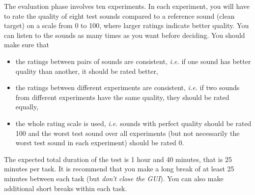 \documentclass[a4paper,12pt]{article}
\begin{document}
\noindent The evaluation phase involves ten experiments. In each experiment, you will have to rate the quality of eight test sounds compared to a reference sound (clean target) on a scale from 0 to 100, where larger ratings indicate better quality. You can listen to the sounds as many times as you want before deciding. You should make sure that
\begin{itemize}
\item the ratings between pairs of sounds are consistent, \textit{i.e.} if one sound has better quality than another, it should be rated better,
\item the ratings between different experiments are consistent, \textit{i.e.} if two sounds from different experiments have the same quality, they should be rated equally,
\item the whole rating scale is used, \textit{i.e.} sounds with perfect quality should be rated 100 and the worst test sound over all experiments (but not necessarily the worst test sound in each experiment) should be rated 0.\\
\end{itemize}

\noindent The expected total duration of the test is 1 hour and 40 minutes, that is 25 minutes per task. It is recommend that you make a long break of at least 25 minutes between each task (but \emph{don't close the GUI}). You can also make additional short breaks within each task.
\end{document}
